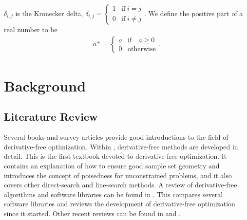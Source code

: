 \documentclass{article}
\begin{document}
$\delta_{i,j}$ is the Kronecker delta, $\delta_{i, j} = \begin{cases} 1 & \textrm{if} \; i = j \\ 0 & \textrm{if} \; i \ne j \end{cases}$.
We define the positive part of a real number to be
\begin{align*}
a^+ = \begin{cases} a & \textrm{if} \quad a \ge 0 \\ 0 & \textrm{otherwise} \end{cases}.\\
\end{align*}



\section{Background}
\subsection{Literature Review}

\label{literature_review}








Several books and survey articles  provide good introductions to the field of derivative-free optimization.
Within \cite{introduction_book}, derivative-free methods are developed in detail.
This is the first textbook devoted to derivative-free optimization.
It contains an explanation of how to ensure good sample set geometry and introduces the concept of 
poisedness for unconstrained problems, and it also covers other direct-search and line-search methods.   A review of derivative-free algorithms and software libraries can be found in \cite{miguel_review}.
This compares several software libraries and reviews the development of derivative-free optimization since it started.
Other recent reviews can be found in \cite{custodio_review2} and \cite{larson_menickelly_wild_2019}.
\end{document}
